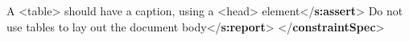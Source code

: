 \begin{shaded}
\hspace*{1em}\hspace*{1em}\hspace*{1em}A <table> should have a caption, using a <head>\mbox{}\newline 
\hspace*{1em}\hspace*{1em}\hspace*{1em}\hspace*{1em}\hspace*{1em}\hspace*{1em}\hspace*{1em}\hspace*{1em} element{</\textbf{s:assert}>}\mbox{}\newline 
\hspace*{1em}\hspace*{1em}\hspace*{1em}Do not use tables to lay out the document body{</\textbf{s:report}>}\mbox{}\newline 
\hspace*{1em}\hspace*{1em}\mbox{}\newline 
\hspace*{1em}\mbox{}\newline 
{}\mbox{}\newline 
{</\textbf{constraintSpec}>}\end{shaded}\egroup\par \par
